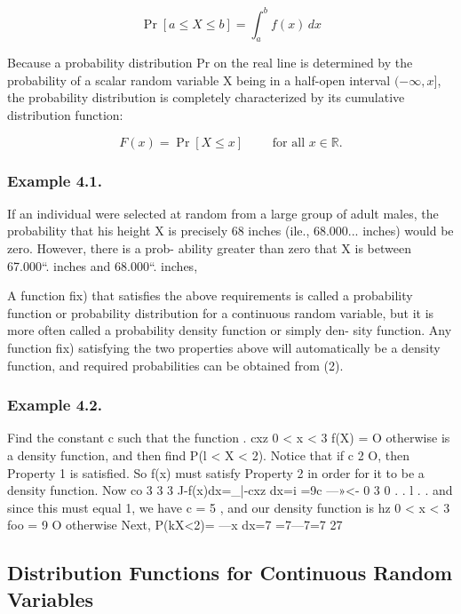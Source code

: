   \[  \Pr[a\le X\le b] = \int_a^b f(x) \, dx \]


Because a probability distribution Pr on the real line is determined by the probability of a scalar random variable X being in a half-open interval $(-\infty, x]$, the probability distribution is completely characterized by its cumulative distribution function:

\[ F(x) = \Pr \left[ X \le x \right] \qquad \text{ for all } x \in \mathbb{R}.\]

\subsubsection*{Example 4.1.}
If an individual were selected at random from a large
group of adult males, the probability that his height X is precisely 68
inches (ile., 68.000... inches) would be zero. However, there is a prob-
ability greater than zero that X is between 67.000“. inches and
68.000“. inches,

A function ﬁx) that satisﬁes the above
requirements is called a probability function
or probability distribution for a continuous
random variable, but it is more often called
a probability density function or simply den-
sity function. Any function ﬁx) satisfying the two properties above will
automatically be a density function, and required probabilities can be
obtained from (2).



\subsubsection*{Example 4.2.} Find the constant c such that the function
. cxz 0 < x < 3
f(X) =
O otherwise
is a density function, and then ﬁnd P(l < X < 2).
Notice that if c 2 O, then Property 1 is satisﬁed. So f(x) must satisfy
Property 2 in order for it to be a density function. Now
co 3 3
3
J-f(x)dx=_|-cxz dx=i =9c
—»<- 0 3 0
. . l . .
and since this must equal 1, we have c = 5 , and our density function
is
hz 0 < x < 3
foo = 9
O otherwise
Next,
P(kX<2)= —x dx=7 =7—7=7
27

\subsection*{Distribution Functions for Continuous Random Variables}

